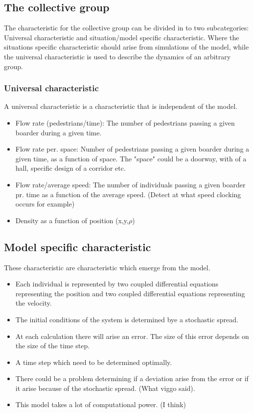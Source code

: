 \subsection{The collective group}
The characteristic for the collective group can be divided in to two subcategories: Universal characteristic and situation/model specific characteristic. Where the situations specific characteristic should arise from simulations of the model, while the universal characteristic is used to describe the dynamics of an arbitrary group. 

\subsubsection{Universal characteristic}
A universal characteristic is a characteristic that is independent of the model.
\begin{itemize}
\item Flow rate (pedestrians/time): The number of pedestrians passing a given boarder during a given time.
\item Flow rate per. space: Number of pedestrians passing a given boarder during a given time, as a function of space. The "space" could be a doorway, with of a hall, specific design of a corridor etc.
\item Flow rate/average speed: The number of individuals passing a given boarder pr. time as a function of the average speed. (Detect at what speed clocking occurs for example)
\item Density as a function of position (x,y,$\rho$)
\end{itemize}

\subsection{Model specific characteristic}
These characteristic are characteristic which emerge from the model.
\begin{itemize}
\item Each individual is represented by two coupled differential equations representing the position and two coupled differential equations representing the velocity.
\item The initial conditions of the system is determined bye a stochastic spread.
\item At each calculation there will arise an error. The size of this error depends on the size of the time step.
\item A time step which need to be determined optimally.

\item There could be a problem determining if a deviation arise from the error or if it arise because of the stochastic spread. (What viggo said).

\item This model takes a lot of computational power. (I think)

\end{itemize}


